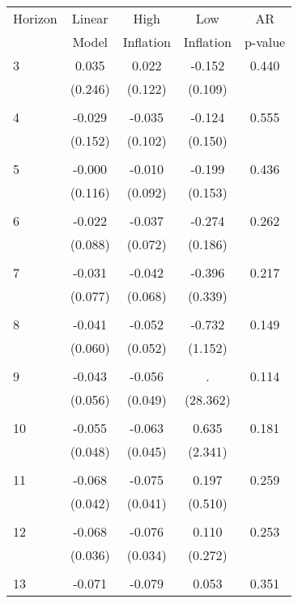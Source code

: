 \begin{tabular}{l*{1}{cccc}}
\hline\hline
 Horizon  & Linear & High                 & Low           & AR            \\
                  & Model         & Inflation & Inflation & p-value       \\
\hline
   3       & 0.035 & 0.022 & -0.152 & 0.440 \\
          & (0.246) & (0.122) & (0.109) & \\
 & & & &\\
   4       & -0.029 & -0.035 & -0.124 & 0.555 \\
          & (0.152) & (0.102) & (0.150) & \\
 & & & &\\
   5       & -0.000 & -0.010 & -0.199 & 0.436 \\
          & (0.116) & (0.092) & (0.153) & \\
 & & & &\\
   6       & -0.022 & -0.037 & -0.274 & 0.262 \\
          & (0.088) & (0.072) & (0.186) & \\
 & & & &\\
   7       & -0.031 & -0.042 & -0.396 & 0.217 \\
          & (0.077) & (0.068) & (0.339) & \\
 & & & &\\
   8       & -0.041 & -0.052 & -0.732 & 0.149 \\
          & (0.060) & (0.052) & (1.152) & \\
 & & & &\\
   9       & -0.043 & -0.056 &     . & 0.114 \\
          & (0.056) & (0.049) & (28.362) & \\
 & & & &\\
  10       & -0.055 & -0.063 & 0.635 & 0.181 \\
          & (0.048) & (0.045) & (2.341) & \\
 & & & &\\
  11       & -0.068 & -0.075 & 0.197 & 0.259 \\
          & (0.042) & (0.041) & (0.510) & \\
 & & & &\\
  12       & -0.068 & -0.076 & 0.110 & 0.253 \\
          & (0.036) & (0.034) & (0.272) & \\
 & & & &\\
  13       & -0.071 & -0.079 & 0.053 & 0.351 \\

\end{tabular}
